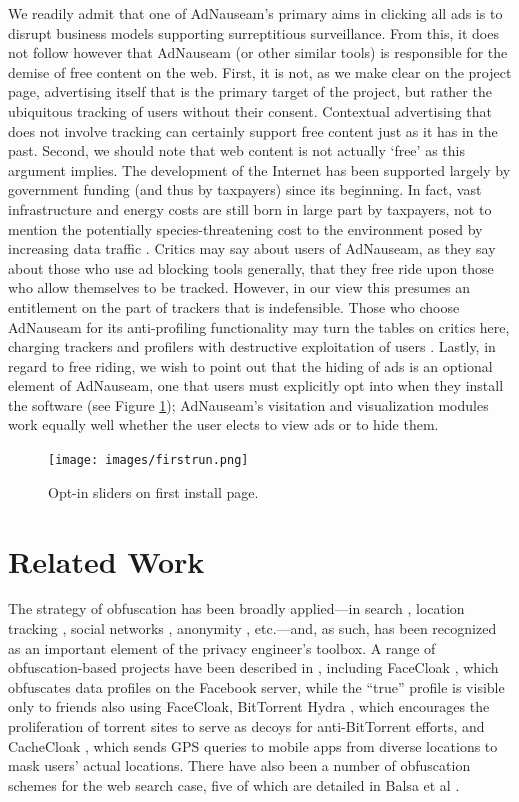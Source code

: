 \documentclass[conference]{IEEEtran}
\begin{document}
We readily admit that one of AdNauseam's primary aims in clicking all ads is to disrupt business models supporting surreptitious surveillance. From this, it does not follow however that AdNauseam (or other similar tools) is responsible for the demise of free content on the web. First, it is not, as we make clear on the project page, advertising itself that is the primary target of the project, but rather the ubiquitous tracking of users without their consent. Contextual advertising that does not involve tracking can certainly support free content just as it has in the past. Second, we should note that web content is not actually ‘free’ as this argument implies. The development of the Internet has been supported largely by government funding (and thus by taxpayers) since its beginning. In fact, vast infrastructure and energy costs are still born in large part by taxpayers, not to mention the potentially species-threatening cost to the environment posed by increasing data traffic \cite{Hazas}. Critics may say about users of AdNauseam, as they say about those who use ad blocking tools generally, that they free ride upon those who allow themselves to be tracked. However, in our view this presumes an entitlement on the part of trackers that is indefensible. Those who choose AdNauseam for its anti-profiling functionality may turn the tables on critics here, charging  trackers and profilers with destructive exploitation of users \cite{Brunton}. Lastly, in regard to free riding, we wish to point out that the hiding of ads is an optional element of AdNauseam, one that users must explicitly opt into when they install the software (see Figure \ref{fig:firstrun}); AdNauseam's visitation and visualization modules work equally well whether the user elects to view ads or to hide them.

\begin{figure}[!t]
\centering
\texttt{[image: images/firstrun.png]}
\caption{Opt-in sliders on first install page.}
\label{fig:firstrun}
\end{figure}


\section{Related Work}

The strategy of obfuscation has been broadly applied---in search \cite{Howe-2}, location tracking \cite{Meyerowitz}, social networks \cite{Luo}, anonymity \cite{Chakravarty, Schulze}, etc.---and, as such, has been recognized as an important element of the privacy engineer's toolbox. A range of obfuscation-based projects have been described in \cite{Brunton}, including FaceCloak \cite{Luo}, which obfuscates data profiles on the Facebook server, while the “true” profile is visible only to friends also using FaceCloak,  BitTorrent Hydra \cite{Schulze}, which encourages the proliferation of torrent sites to serve as decoys for anti-BitTorrent efforts, and CacheCloak \cite{Meyerowitz}, which sends GPS queries to mobile apps from diverse locations to mask users' actual locations. There have also been a number of obfuscation schemes for the web search case, five of which are detailed in Balsa et al \cite{Balsa}.
\end{document}
